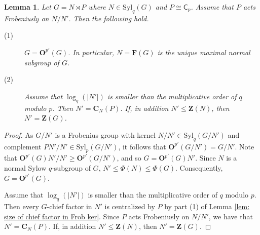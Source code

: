 \documentclass[9pt]{article}
\newtheorem{lem}{\bf Lemma}[section]
\begin{document}
\begin{lem}\label{lem: P act fpf on N/N'}
	Let $G=N \rtimes P$ where $N\in \mathrm{Syl}_{q}(G)$ and $P\cong \mathsf{C}_{p}$.
	Assume that $P$ acts Frobeniusly on $N/N'$.
	Then the following hold.
	\begin{description}
		\item[(1)] $G=\mathbf{O}^{p'}(G)$. In particular, $N=\mathbf{F}(G)$ is the unique maximal normal subgroup of $G$.
		\item[(2)] Assume that $\log_q(|N'|)$ is smaller than the multiplicative order of $q$ modulo $p$. 
		Then $N'=\mathbf{C}_{N}(P)$. 
		If, in addition $N'\leq \mathbf{Z}(N)$, then $N'=\mathbf{Z}(G)$. 
	\end{description}
\end{lem}
\begin{proof}
	As $G/N'$ is a Frobenius group with kernel $N/N'\in \mathrm{Syl}_{q}(G/N')$ and complement $PN'/N'\in \mathrm{Syl}_{p}(G/N')$,
	it follows that $\mathbf{O}^{p'}(G/N')=G/N'$.
	Note that $\mathbf{O}^{p'}(G)N'/N'\geq \mathbf{O}^{p'}(G/N')$,
	and so $G=\mathbf{O}^{p'}(G)N'$.
	Since $N$ is a normal Sylow $q$-subgroup of $G$, $N'\leq \Phi(N)\leq \Phi(G)$.
	Consequently, $G=\mathbf{O}^{p'}(G)$.

	Assume that $\log_q(|N'|)$ is smaller than the multiplicative order of $q$ modulo $p$. 
    Then every $G$-chief factor in $N'$ is centralized by $P$ by part (1) of Lemma \ref{lem: size of chief factor in Frob ker}.
	Since $P$ acts Frobeniusly on $N/N'$,
	we have that $N'=\mathbf{C}_{N}(P)$.
	If, in addition $N'\leq \mathbf{Z}(N)$, then $N'=\mathbf{Z}(G)$.
\end{proof}
\end{document}
